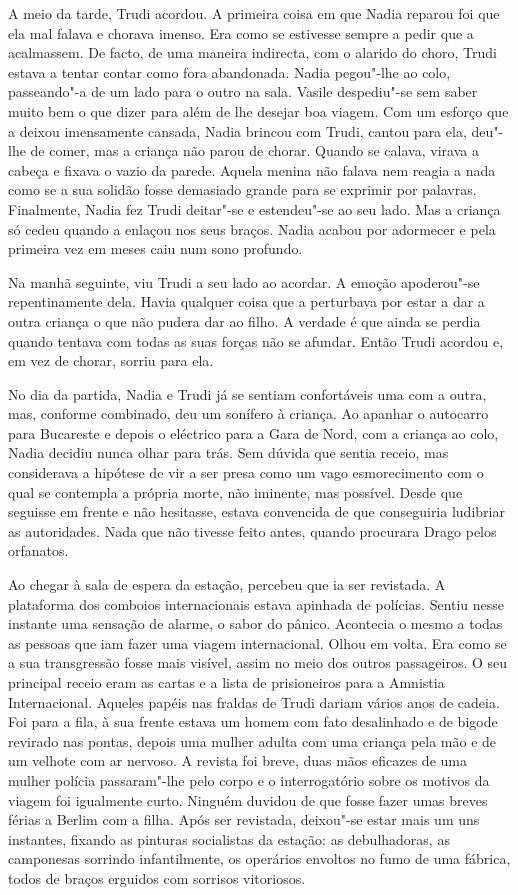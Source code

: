 A meio da tarde, Trudi acordou. A primeira coisa em
que Nadia reparou foi que ela mal falava e chorava imenso. Era como se
estivesse sempre a pedir que a acalmassem. De facto, de uma maneira
indirecta, com o alarido do choro, Trudi estava a tentar contar como
fora abandonada. Nadia pegou"-lhe ao colo, passeando"-a de um lado para o
outro na sala. Vasile despediu"-se sem saber muito bem o que dizer para
além de lhe desejar boa viagem. Com um esforço que a deixou imensamente
cansada, Nadia brincou com Trudi, cantou para ela, deu"-lhe de comer, mas
a criança não parou
de chorar. Quando se calava, virava a cabeça e fixava o vazio da parede.
Aquela menina não falava nem reagia a nada como se a sua solidão fosse
demasiado grande para se exprimir por palavras. Finalmente, Nadia fez
Trudi deitar"-se e estendeu"-se ao seu lado. Mas a criança só cedeu quando
a enlaçou nos seus braços. Nadia acabou por adormecer e pela primeira
vez em meses caiu num sono profundo.

Na manhã seguinte, viu Trudi a seu lado ao acordar. A emoção apoderou"-se
repentinamente dela. Havia qualquer coisa que a perturbava por estar a
dar a outra criança o que não pudera dar ao filho. A verdade é que ainda
se perdia quando tentava com todas as suas forças não se afundar. Então
Trudi acordou e, em vez de chorar, sorriu para ela.

\bigskip

No dia da partida, Nadia e Trudi já se sentiam confortáveis uma com a
outra, mas, conforme combinado, deu um sonífero à criança. Ao apanhar o
autocarro para Bucareste e depois o eléctrico para a Gara de Nord, com
a criança ao colo, Nadia decidiu nunca olhar para trás. Sem dúvida que
sentia receio, mas considerava a hipótese de vir a ser presa como um
vago esmorecimento com o qual se contempla a própria morte, não
iminente, mas possível. Desde que seguisse em frente e não hesitasse,
estava convencida de que conseguiria ludibriar as autoridades. Nada
que não tivesse feito antes, quando procurara Drago pelos orfanatos.

Ao chegar à sala de espera da estação, percebeu que ia ser revistada. A
plataforma dos comboios internacionais
estava apinhada de polícias. Sentiu nesse instante uma sensação de
alarme, o sabor do pânico. Acontecia o mesmo a todas as pessoas que iam
fazer uma viagem internacional. Olhou em volta. Era como se a sua
transgressão fosse mais visível, assim no meio dos outros passageiros. O
seu principal receio eram as cartas e a lista de prisioneiros para a
Amnistia Internacional. Aqueles papéis nas fraldas de Trudi dariam
vários anos de cadeia. Foi para a fila, à sua frente estava um homem com
fato desalinhado e de bigode revirado nas pontas, depois uma mulher
adulta com uma criança pela mão e de um velhote com ar nervoso. A
revista foi breve, duas mãos eficazes de uma mulher polícia passaram"-lhe
pelo corpo e o interrogatório sobre os motivos da viagem foi
igualmente curto. Ninguém duvidou de que fosse fazer umas breves férias
a Berlim com a filha. Após ser revistada, deixou"-se estar mais um uns
instantes, fixando as pinturas socialistas da estação: as debulhadoras, as camponesas sorrindo infantilmente, os operários envoltos no fumo
de uma fábrica, todos de braços erguidos com sorrisos vitoriosos.

